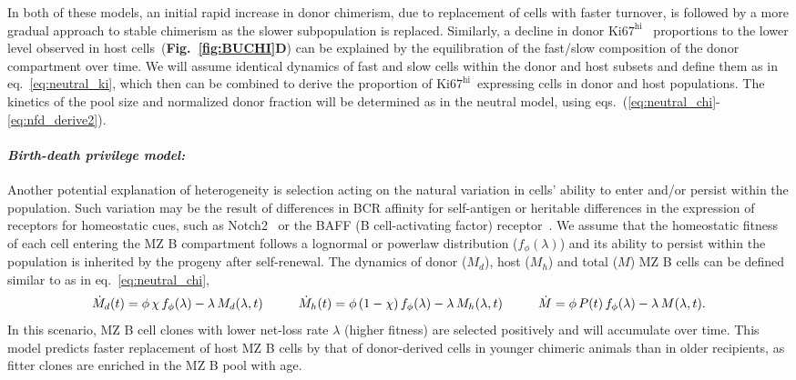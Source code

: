 \documentclass[11pt]{article}
\newcommand{\khi}{\ensuremath{\text{Ki67}^\text{hi}}~}
\newcommand{\para}[1]{\vspace*{-4.5mm}\paragraph{#1}}
\begin{document}
In both of these models, an initial rapid increase in donor chimerism, due to replacement of cells with faster turnover, is followed by a more gradual approach to stable chimerism as the slower subpopulation is replaced.
Similarly, a decline in donor {\khi} proportions to the lower level observed in host cells~(\textbf{Fig.~\ref{fig:BUCHI}D}) can be explained by the equilibration of the fast/slow composition of the donor compartment over time.
We will assume identical dynamics of fast and slow cells within the donor and host subsets and define them as in eq.~\ref{eq:neutral_ki}, which then can be combined to derive the proportion of \khi expressing cells in donor and host populations.
The kinetics of the pool size and normalized donor fraction will be determined as in the neutral model, using eqs.~(\ref{eq:neutral_chi}-\ref{eq:nfd_derive2}).


\para{\textit{Birth-death privilege model:}}
Another potential explanation of heterogeneity is selection acting on the natural variation in cells' ability to enter and/or persist within the population.  
Such variation may be the result of differences in BCR affinity for self-antigen or heritable differences in the expression of receptors for homeostatic cues, such as Notch2~\cite{Witt_2003, Saito_2003} or the BAFF (B cell-activating factor) receptor~\cite{Thien_2004, Thompson_2001}.
We assume that the homeostatic fitness of each cell entering the MZ B compartment follows a lognormal or powerlaw distribution ($f_{\phi}(\lambda)$) and its ability to persist within the population is inherited by the progeny after self-renewal. 
The dynamics of donor ($M_{d}$), host ($M_{h}$) and total ($M$) MZ B cells can be defined similar to as in eq.~\ref{eq:neutral_chi},
\begin{equation} \small
\dot M_{d}(t) = \phi \, \chi \, f_{\phi}(\lambda) - \lambda \, M_{d}(\lambda, t) \quad \quad \quad
\dot M_{h}(t) = \phi \, (1-\chi) \, f_{\phi}(\lambda) - \lambda \, M_{h}(\lambda, t) \quad \quad \quad
\dot{M} = \phi \,P(t) \, f_{\phi}(\lambda) - \lambda \, M(\lambda, t).
\end{equation}
In this scenario, MZ B cell clones with lower net-loss rate $\lambda$ (higher fitness) are selected positively and will accumulate over time.
This model predicts faster replacement of host MZ B cells by that of donor-derived cells in younger chimeric animals than in older recipients, as fitter clones are enriched in the MZ B pool with age.
\end{document}

